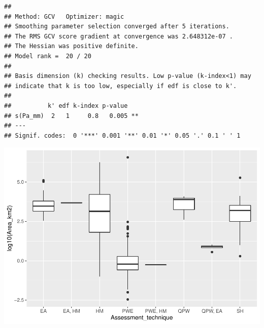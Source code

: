 \documentclass[]{elsarticle} %
\newenvironment{Shaded}{\begin{snugshade}}{\end{snugshade}}
\newcommand{\DataTypeTok}[1]{\textcolor[rgb]{0.13,0.29,0.53}{#1}}
\newcommand{\KeywordTok}[1]{\textcolor[rgb]{0.13,0.29,0.53}{\textbf{#1}}}
\newcommand{\NormalTok}[1]{#1}
\newcommand{\OperatorTok}[1]{\textcolor[rgb]{0.81,0.36,0.00}{\textbf{#1}}}
\newcommand{\StringTok}[1]{\textcolor[rgb]{0.31,0.60,0.02}{#1}}
\begin{document}
\begin{verbatim}
## 
## Method: GCV   Optimizer: magic
## Smoothing parameter selection converged after 5 iterations.
## The RMS GCV score gradient at convergence was 2.648312e-07 .
## The Hessian was positive definite.
## Model rank =  20 / 20 
## 
## Basis dimension (k) checking results. Low p-value (k-index<1) may
## indicate that k is too low, especially if edf is close to k'.
## 
##          k' edf k-index p-value   
## s(Pa_mm)  2   1     0.8   0.005 **
## ---
## Signif. codes:  0 '***' 0.001 '**' 0.01 '*' 0.05 '.' 0.1 ' ' 1
\end{verbatim}

\begin{Shaded}
\end{Shaded}

\includegraphics{Forest_and_Water_files/figure-latex/unnamed-chunk-6-1.pdf}

\begin{Shaded}
\end{Shaded}
\end{document}
